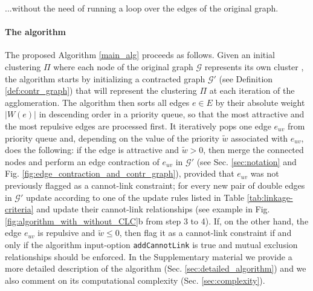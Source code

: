  ...without the need of running a loop over the edges of the original graph.


\paragraph{The algorithm} The proposed Algorithm \ref{main_alg} proceeds as follows. Given an initial clustering $\Pi$ where each node of the original graph $\mathcal{G}$ represents its own cluster  , the algorithm starts by initializing a contracted graph $\mathcal{G}'$ (see Definition \ref{def:contr_graph}) that will represent the clustering $\Pi$ at each iteration of the agglomeration. The algorithm then sorts all edges $e\in E$ by their absolute weight $|W(e)|$ in descending order in a priority queue, so that the most attractive and the most repulsive edges are processed first. It iteratively pops one edge $e_{uv}$ from priority queue and, depending on the value of the priority $\tilde{w}$ associated with $e_{uv}$, does the following: if the edge is attractive and $\tilde{w}>0$, then merge the connected nodes and perform an edge contraction of $e_{uv}$ in $\mathcal{G}'$ (see Sec. \ref{sec:notation} and Fig. \ref{fig:edge_contraction_and_contr_graph}), provided that $e_{uv}$ was not previously flagged as a cannot-link constraint; for every new pair of double edges in $\mathcal{G}'$ update  according to one of the update rules listed in Table \ref{tab:linkage-criteria} and update their cannot-link relationships (see example in Fig. \ref{fig:algorithm_with_without_CLC}b from step 3 to 4). If, on the other hand, the edge $e_{uv}$ is repulsive and $\tilde{w}\leq 0$, then flag it as a cannot-link constraint if and only if the algorithm input-option \texttt{addCannotLink} is true and mutual exclusion relationships should be enforced.
In the Supplementary material we provide a more detailed description of the algorithm (Sec. \ref{sec:detailed_algorithm}) and we also comment on its computational complexity (Sec. \ref{sec:complexity}).

